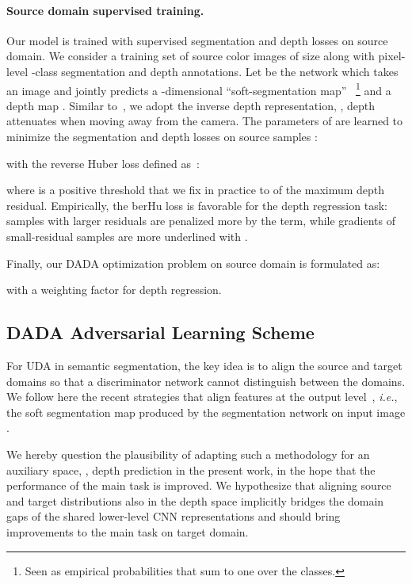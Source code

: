 \documentclass[10pt,twocolumn,letterpaper]{article}
\begin{document}
\vspace{-0.3cm}
\paragraph{Source domain supervised training.} Our model is trained with supervised segmentation and depth losses on source domain.
We consider a training set  of source color images of size  along with pixel-level -class segmentation and depth annotations. 
Let  be the network which takes an image  and jointly predicts a -dimensional ``soft-segmentation map'' ~\footnote{Seen as empirical probabilities that sum to one over the  classes.} and a depth map .
Similar to~\cite{kendall2017multitask}, we adopt the inverse depth representation, \ie, depth attenuates when moving away from the camera.
The parameters  of  are learned to minimize the segmentation and depth losses on source samples :

with the reverse Huber loss defined as~\cite{laina2016deeper}:

where  is a positive threshold that we fix in practice to  of the maximum depth residual.
Empirically, the berHu loss is favorable for the depth regression task: samples with larger residuals are penalized more by the  term, while gradients of small-residual samples are more underlined with .

Finally, our DADA optimization problem on source domain is formulated as:

with  a weighting factor for depth regression.

\subsection{DADA Adversarial Learning Scheme}\label{sec:dada_learning}
For UDA in semantic segmentation, the key idea is to align the source and target domains so that a discriminator network cannot distinguish between the domains.
We follow here the recent strategies that align features at the output level~\cite{tsai2018learning,vu2018advent}, \textit{i.e.}, the soft segmentation map  produced by the segmentation network  on input image .

We hereby question the plausibility of adapting such a methodology for an auxiliary space, \ie, depth prediction  in the present work, in the hope that the performance of the main task is improved.
We hypothesize that aligning source and target distributions also in the depth space implicitly bridges the domain gaps of the shared lower-level CNN representations and should bring improvements to the main task on target domain.
\end{document}
